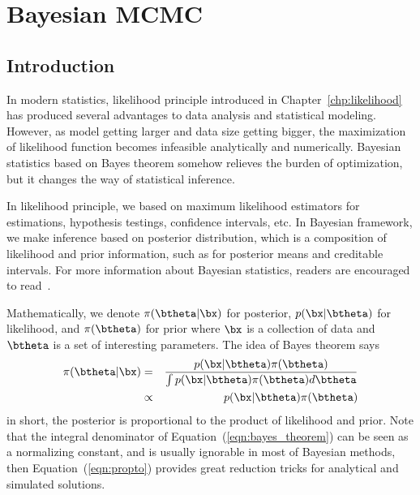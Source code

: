 \chapter{Bayesian MCMC}
\label{chp:mcmc}



\section{Introduction}

In modern statistics, likelihood principle introduced in
Chapter~\ref{chp:likelihood} has produced several advantages to data analysis
and statistical modeling. However, as model getting larger and data size
getting bigger, the maximization of likelihood function becomes infeasible
analytically and numerically. Bayesian statistics based on Bayes theorem
somehow relieves the burden of optimization, but it changes the way of
statistical inference.

In likelihood principle, we based on maximum likelihood
estimators for estimations, hypothesis testings, confidence intervals, etc.
In Bayesian framework, we make inference based on posterior distribution,
which is a composition of likelihood and prior information,
such as for posterior means and creditable intervals.
For more information about
Bayesian statistics, readers are encouraged to
read~\citet{Berger1993,Gelman2003}.

Mathematically, we denote $\pi(\btheta|\bx)$ for posterior, $p(\bx|\btheta)$
for likelihood, and $\pi(\btheta)$ for prior where $\bx$ is a collection of
data and $\btheta$ is a set of interesting parameters. The idea of Bayes
theorem says
\begin{eqnarray}
\pi(\btheta|\bx)
& = & \frac{p(\bx|\btheta) \pi(\btheta)}{\int p(\bx|\btheta) \pi(\btheta) d\btheta}
      \label{eqn:bayes_theorem} \\
& \propto & p(\bx|\btheta) \pi(\btheta)
            \label{eqn:propto}
\end{eqnarray}
in short, the posterior is proportional to the product of likelihood and prior.
Note that the integral denominator of Equation~(\ref{eqn:bayes_theorem}) can be
seen as a normalizing constant, and is usually ignorable in most of Bayesian
methods, then Equation~(\ref{eqn:propto}) provides great reduction tricks for
analytical and simulated solutions. 

